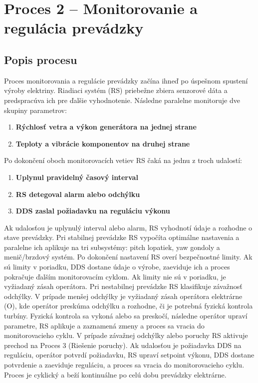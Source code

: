 \documentclass[12pt,a4paper]{article}
\begin{document}
\newpage
\section{Proces 2 -- Monitorovanie a regulácia prevádzky}
\subsection{Popis procesu}
Proces monitorovania a regulácie prevádzky začína ihneď po úspešnom spustení výroby elektriny. Riadiaci systém (RS) priebežne zbiera senzorové dáta a predspracúva ich pre ďalšie vyhodnotenie. Následne paralelne monitoruje dve skupiny parametrov: 
\vspace{0.6em}
\begin{enumerate}[noitemsep, topsep=2pt, leftmargin=1.5cm]
    \item \textbf{Rýchlosť vetra a výkon generátora na jednej strane}
    \item \textbf{Teploty a vibrácie komponentov na druhej strane}
\end{enumerate}
\vspace{0.6em}
Po dokončení oboch monitorovacích vetiev RS čaká na jednu z troch udalostí:
\vspace{0.6em}
\begin{enumerate}[noitemsep, topsep=2pt, leftmargin=1.5cm]
    \item \textbf{Uplynul pravidelný časový interval}
    \item \textbf{RS detegoval alarm alebo odchýlku}
     \item \textbf{DDS zaslal požiadavku na reguláciu výkonu}
\end{enumerate}
\vspace{0.6em}

Ak udalosťou je uplynulý interval alebo alarm, RS vyhodnotí údaje a rozhodne o stave prevádzky. Pri stabilnej prevádzke RS vypočíta optimálne nastavenia a paralelne ich aplikuje na tri subsystémy: pitch lopatiek, yaw gondoly a menič/brzdový systém. Po dokončení nastavení RS overí bezpečnostné limity. Ak sú limity v poriadku, DDS dostane údaje o výrobe, zaeviduje ich a proces pokračuje ďalším monitorovacím cyklom. Ak limity nie sú v poriadku, je vyžiadaný zásah operátora.
Pri nestabilnej prevádzke RS klasifikuje závažnosť odchýlky. V prípade menšej odchýlky je vyžiadaný zásah operátora elektrárne (O), kde operátor preskúma odchýlku a rozhodne, či je potrebná fyzická kontrola turbíny. Fyzická kontrola sa vykoná alebo sa preskočí, následne operátor upraví parametre, RS aplikuje a zaznamená zmeny a proces sa vracia do monitorovacieho cyklu. V prípade závažnej odchýlky alebo poruchy RS aktivuje prechod na Proces 3 (Riešenie poruchy).
Ak udalosťou je požiadavka DDS na reguláciu, operátor potvrdí požiadavku, RS upraví setpoint výkonu, DDS dostane potvrdenie a zaeviduje reguláciu, a proces sa vracia do monitorovacieho cyklu. Proces je cyklický a beží kontinuálne po celú dobu prevádzky elektrárne.
\end{document}
